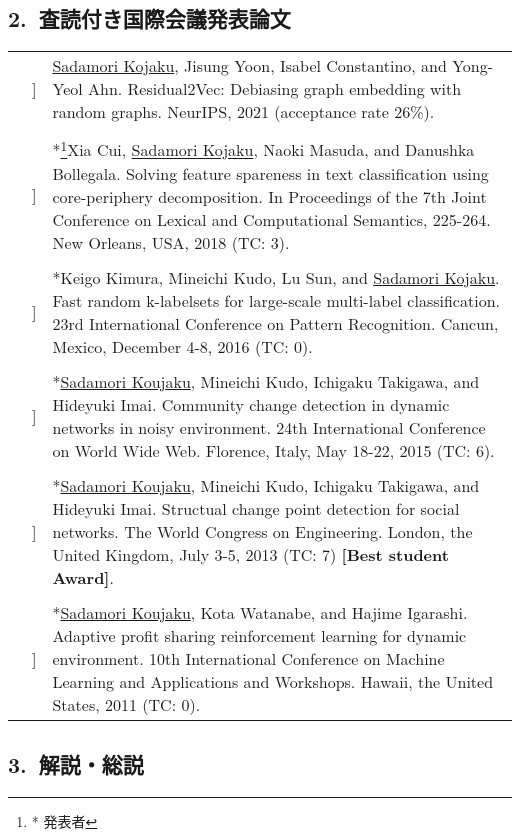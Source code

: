 \documentclass[letterpaper, 11pt]{article}
\newcounter{papercount}
\newcounter{papertype}
\newcommand{\changepapertype}{\setcounter{papercount}{0}\stepcounter{papertype}}
\newcommand{\paperitem}{%
\stepcounter{papercount}%
{\color{OliveGreen}{[\arabic{papertype}.\thepapercount}]}
}
\def\CT#1{TC: #1}
\begin{document}
\subsection*{2.~査読付き国際会議発表論文}
\changepapertype
\begin{longtable}{p{0in}p{2em}p{5.5in}}
    &\paperitem & \underline{Sadamori Kojaku}, Jisung Yoon, Isabel Constantino, and Yong-Yeol Ahn.
    Residual2Vec: Debiasing graph embedding with random graphs. NeurIPS, 2021 (acceptance rate 26\%). \\
    & & \\
    &\paperitem & *\footnote{* 発表者}Xia Cui, \underline{Sadamori Kojaku}, Naoki Masuda, and Danushka Bollegala. Solving feature spareness in text classification using core-periphery decomposition. In Proceedings of the 7th Joint Conference on Lexical and Computational Semantics, 225-264. New Orleans, USA, 2018 (\CT{3}).\\
    & & \\
    &\paperitem & *Keigo Kimura, Mineichi Kudo, Lu Sun, and \underline{Sadamori Kojaku}. Fast random k-labelsets for large-scale multi-label classification. 23rd International Conference on Pattern Recognition. Cancun, Mexico, December 4-8, 2016 (\CT{0}).\\
    & & \\
    &\paperitem & *\underline{Sadamori Koujaku}, Mineichi Kudo, Ichigaku Takigawa, and Hideyuki Imai.
    Community change detection in dynamic networks in noisy environment.
    24th International Conference on World Wide Web. Florence, Italy, May 18-22, 2015 (\CT{6}).\\
    & \\
    &\paperitem &  *\underline{Sadamori Koujaku}, Mineichi Kudo, Ichigaku Takigawa, and Hideyuki Imai.
    Structual change point detection for social networks.
    The World Congress on Engineering. London, the United Kingdom, July 3-5, 2013 (\CT{7}) {\bf [Best student Award]}.\\
    & \\
    &\paperitem & *\underline{Sadamori Koujaku}, Kota Watanabe, and Hajime Igarashi.
    Adaptive profit sharing reinforcement learning for dynamic environment.
    10th International Conference on Machine Learning and Applications and Workshops. Hawaii, the United States, 2011 (\CT{0}). \\
\end{longtable}

\subsection*{3.~解説・総説}
\end{document}
